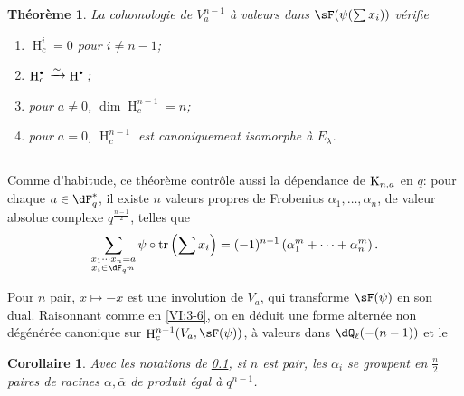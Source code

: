 \documentclass[oneside]{book}
\DeclareMathOperator{\h}{H}
\DeclareMathOperator{\tr}{tr}
\newcommand{\iso}{\xrightarrow\sim}
\newcommand{\kloos}{\textnormal{K}} %
\theoremstyle{sga-source}
\theoremstyle{sga-source-dash}
\theoremstyle{sga-source-dotdash}
\theoremstyle{sga-source-number-note-dash}
\theoremstyle{sga-source-note-number-dotdash}
\theoremstyle{sga-source-example-dotdash}
\theoremstyle{sga-source-inline-number}
\theoremstyle{sga-source-bare-number}
\theoremstyle{sga-source}
\newtheorem{corollary_}[subsection]{Corollaire}
\newtheorem{theorem_}[subsection]{Théorème}
\let\oldbullet\bullet
\renewcommand{\bullet}{\textnormal{\tiny$\oldbullet$}}
\newcommand{\PrintPage}[1]{}\newcommand{\MathPage}[1]{}\newcommand{\PrintCite}[2]{#1}\newcommand{\var}[3]{#1}
\begin{document}
\begin{theorem_}\label{VI:7-4}
La cohomologie de $V_a^{n-1}$ à valeurs dans $\sF(\psi(\sum x_i))$ vérifie 
\begin{enumerate}[\indent (i)]
  \item $\h_c^i=0$ pour $i\ne n-1$; 
  \item $\h_c^\bullet{} \iso \h^\bullet{}$; 
  \item pour $a\ne 0$, $\dim \h_c^{n-1}{}=n$; 
  \PrintPage{221}
\item pour $a=0$, $\h_c^{n-1}{}$ est canoniquement isomorphe à $E_\lambda$. 
\end{enumerate}
\end{theorem_}





\subsection{}\label{VI:7-5}

Comme d'habitude, ce théorème contrôle aussi la dépendance de 
$\kloos_{n,a}$ en $q$: pour chaque $a\in \dF_q^\ast$, il existe $n$ valeurs 
propres de Frobenius $\alpha_1,\dots,\alpha_n$, de valeur absolue complexe 
$q^{\frac{n-1}{2}}$, telles que 
\[
  \sum_{\substack{x_1\dotsm x_n = a \\ x_i\in \dF_{q^m}}} \psi\circ \tr\left(\sum x_i\right) = (-1)^{n-1} \left(\alpha_1^m + \cdots + \alpha_n^m \right) \text{.} 
\]

Pour $n$ pair, $x\mapsto -x$ est une involution de $V_a$, qui transforme 
$\sF(\psi)$ en son dual. Raisonnant comme en \ref{VI:3-6}, on en déduit une 
forme alternée non dégénérée canonique sur $\h_c^{n-1}(V_a,\sF(\psi))$, 
à valeurs dans $\dQ_\ell(-(n-1))$ et le 





\begin{corollary_}\label{VI:7-6}
Avec les notations de \ref{VI:7-5}, si $n$ est pair, les $\alpha_i$ se groupent 
en $\frac n 2$ paires de racines $\alpha,\bar\alpha$ de produit égal à 
$q^{n-1}$. 
\end{corollary_}





\subsection{}\label{VI:7-7}
\end{document}
